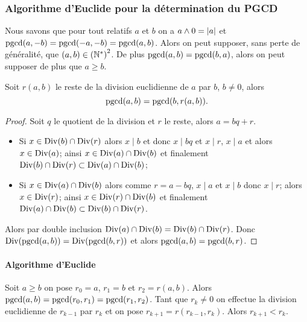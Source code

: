 \subsubsection{Algorithme d'Euclide pour la détermination du PGCD}


Nous savons que pour tout relatifs \(a\) et \(b\) on a \(a \wedge 0 = \left\lvert a\right\rvert\)
et \(\operatorname{pgcd}(a,-b) = \operatorname{pgcd}(-a,-b) = \operatorname{pgcd}(a,b)\). Alors on peut supposer, sans
perte de généralité, que \((a,b) \in \left(\mathbb{N}^{*}\right)^{2}\). De plus
\(\operatorname{pgcd}(a,b) =\operatorname{pgcd}(b,a)\), alors on peut supposer de plus que \(a \geqslant
b\).

\begin{lemme}
  Soit \(r(a,b)\) le reste de la division euclidienne de \(a\) par \(b\), \(b
  \neq 0\), alors
  \begin{equation}
    \operatorname{pgcd}(a,b) = \operatorname{pgcd}(b,r(a,b)).
  \end{equation}
\end{lemme}
\begin{proof}
  Soit \(q\) le quotient de la division et \(r\) le reste, alors \(a=bq+r\).
  \begin{itemize}
    \item Si \(x \in \operatorname{Div}(b) \cap \operatorname{Div}(r)\) alors \(x \mid b\) et donc \(x \mid
      bq\) et \(x \mid r\), \(x \mid a\) et alors \(x \in \operatorname{Div}(a)\); ainsi \(x
      \in \operatorname{Div}(a) \cap \operatorname{Div}(b)\) et finalement \(\operatorname{Div}(b) \cap \operatorname{Div}(r) \subset
      \operatorname{Div}(a) \cap \operatorname{Div}(b)\);
    \item Si \(x \in \operatorname{Div}(a) \cap \operatorname{Div}(b)\) alors comme \(r=a-bq\), \(x \mid a\)
      et \(x \mid b\) donc \(x \mid r\); alors \(x \in \operatorname{Div}(r)\); ainsi \(x \in
      \operatorname{Div}(r) \cap \operatorname{Div}(b)\) et finalement \(\operatorname{Div}(a) \cap \operatorname{Div}(b) \subset
      \operatorname{Div}(b) \cap \operatorname{Div}(r)\).
  \end{itemize}
  Alors par double inclusion \(\operatorname{Div}(a) \cap \operatorname{Div}(b)= \operatorname{Div}(b) \cap \operatorname{Div}(r)\).
  Donc \(\operatorname{Div}(\operatorname{pgcd}(a,b)) = \operatorname{Div}(\operatorname{pgcd}(b,r))\) et alors \(\operatorname{pgcd}(a,b) =
  \operatorname{pgcd}(b,r)\).
\end{proof}

\paragraph{Algorithme d'Euclide}

Soit \(a \geqslant b\) on pose \(r_0=a\), \(r_1=b\) et \(r_2=r(a,b)\). Alors
\(\operatorname{pgcd}(a,b) = \operatorname{pgcd}(r_0, r_1) = \operatorname{pgcd}(r_1,r_2)\). Tant que \(r_k \neq 0\) on
effectue la division euclidienne de \(r_{k-1}\) par \(r_k\) et on pose
\(r_{k+1}=r(r_{k-1},r_k)\). Alors \(r_{k+1} < r_k\).

